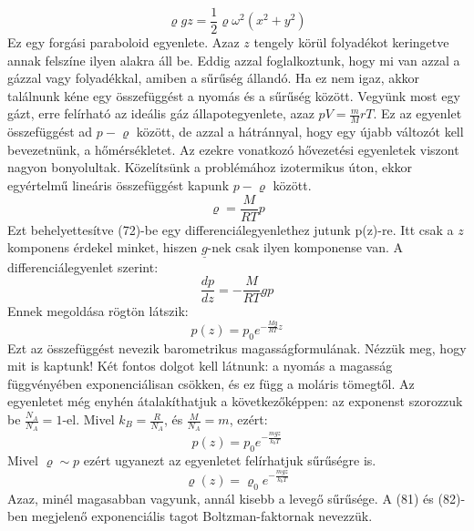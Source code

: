\documentclass[a4paper,12pt]{article}
\begin{document}
\begin{equation}
\varrho gz=\frac{1}{2}\varrho\omega^2(x^2+y^2)
\end{equation}
Ez egy forgási paraboloid egyenlete. Azaz $z$ tengely körül folyadékot keringetve annak felszíne ilyen alakra áll be.
Eddig azzal foglalkoztunk, hogy mi van azzal a gázzal vagy folyadékkal, amiben a sűrűség állandó. Ha ez nem igaz, akkor találnunk kéne egy összefüggést a nyomás és a sűrűség között. Vegyünk most egy gázt, erre felírható az ideális gáz állapotegyenlete, azaz $pV=\frac{m}{M}rT$. Ez az egyenlet összefüggést ad $p-\varrho$ között, de azzal a hátránnyal, hogy egy újabb változót kell bevezetnünk, a hőmérsékletet. Az ezekre vonatkozó hővezetési egyenletek viszont nagyon bonyolultak. Közelítsünk a problémához izotermikus úton, ekkor egyértelmű lineáris összefüggést kapunk $p-\varrho$ között.
\begin{equation}
\varrho=\frac{M}{RT}p
\end{equation}
Ezt behelyettesítve (72)-be egy differenciálegyenlethez jutunk p(z)-re. Itt csak a $z$ komponens érdekel minket, hiszen $\underline{g}$-nek csak ilyen komponense van. A differenciálegyenlet szerint:
\begin{equation}
\frac{dp}{dz}=-\frac{M}{RT}gp
\end{equation}
Ennek megoldása rögtön látszik:
\begin{equation}
p(z)=p_0e^{-\frac{Mg}{RT}z}
\end{equation}
Ezt az összefüggést nevezik barometrikus magasságformulának. Nézzük meg, hogy mit is kaptunk! Két fontos dolgot kell látnunk: a nyomás a magasság függvényében exponenciálisan csökken, és ez függ a moláris tömegtől. Az egyenletet még enyhén átalakíthatjuk a következőképpen: az exponenst szorozzuk be $\frac{N_A}{N_A}=1$-el. Mivel $k_B=\frac{R}{N_A}$, és $\frac{M}{N_A}=m$, ezért:
\begin{equation}
p(z)=p_0e^{-\frac{mgz}{k_bT}}
\end{equation}
Mivel $\varrho\sim p$ ezért ugyanezt az egyenletet felírhatjuk sűrűségre is.
\begin{equation}
\varrho(z)=\varrho_0e^{-\frac{mgz}{k_bT}}
\end{equation}
Azaz, minél magasabban vagyunk, annál kisebb a levegő sűrűsége. A (81) és (82)-ben megjelenő exponenciális tagot Boltzman-faktornak nevezzük.
\end{document}
